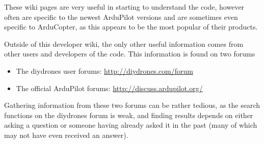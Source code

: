 These wiki pages are very useful in starting to understand the code, however often are specific to the newest ArduPilot versions and are sometimes even specific to ArduCopter, as this appears to be the most popular of their products. 

Outside of this developer wiki, the only other useful information comes from other users and developers of the code. This information is found on two forums

\begin{itemize}
	\item The diydrones user forums: \url{http://diydrones.com/forum}
	\item The official ArduPilot forums: \url{http://discuss.ardupilot.org/}
\end{itemize}

Gathering information from these two forums can be rather tedious, as the search functions on the diydrones forum is weak, and finding results depends on either asking a question or someone having already asked it in the past (many of which may not have even received an answer). 

